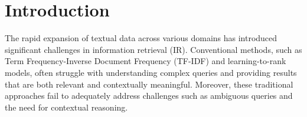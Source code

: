 
\section{Introduction}
The rapid expansion of textual data across various domains has introduced significant challenges in information retrieval (IR). Conventional methods, such as Term Frequency-Inverse Document Frequency (TF-IDF) and learning-to-rank models, often struggle with understanding complex queries and providing results that are both relevant and contextually meaningful. Moreover, these traditional approaches fail to adequately address challenges such as ambiguous queries and the need for contextual reasoning.

